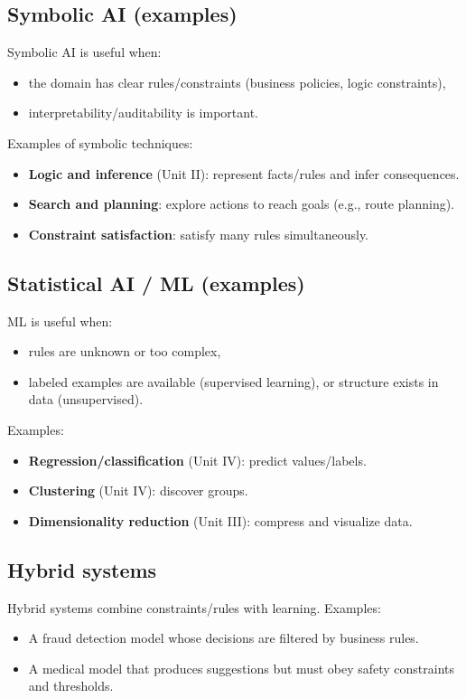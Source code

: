 \documentclass[11pt]{article}
\begin{document}
\subsection{Symbolic AI (examples)}
Symbolic AI is useful when:
\begin{itemize}[leftmargin=*]
  \item the domain has clear rules/constraints (business policies, logic constraints),
  \item interpretability/auditability is important.
\end{itemize}
Examples of symbolic techniques:
\begin{itemize}[leftmargin=*]
  \item \textbf{Logic and inference} (Unit II): represent facts/rules and infer consequences.
  \item \textbf{Search and planning}: explore actions to reach goals (e.g., route planning).
  \item \textbf{Constraint satisfaction}: satisfy many rules simultaneously.
\end{itemize}

\subsection{Statistical AI / ML (examples)}
ML is useful when:
\begin{itemize}[leftmargin=*]
  \item rules are unknown or too complex,
  \item labeled examples are available (supervised learning), or structure exists in data (unsupervised).
\end{itemize}
Examples:
\begin{itemize}[leftmargin=*]
  \item \textbf{Regression/classification} (Unit IV): predict values/labels.
  \item \textbf{Clustering} (Unit IV): discover groups.
  \item \textbf{Dimensionality reduction} (Unit III): compress and visualize data.
\end{itemize}

\subsection{Hybrid systems}
Hybrid systems combine constraints/rules with learning. Examples:
\begin{itemize}[leftmargin=*]
  \item A fraud detection model whose decisions are filtered by business rules.
  \item A medical model that produces suggestions but must obey safety constraints and thresholds.
\end{itemize}
\end{document}
